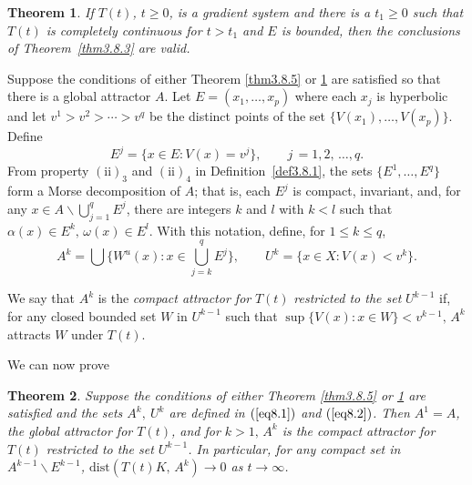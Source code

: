 \documentclass{surv-l}
\theoremstyle{plain}
\newtheorem{theorem}{Theorem}[section]
\theoremstyle{definition}
\numberwithin{equation}{section}
\numberwithin{figure}{chapter}
\begin{document}
\begin{theorem}\label{thm3.8.6} If $T(t)$, $t\geq 0$, is a gradient system and there is a $t_{1}\geq 0$ such that $T(t)$ is completely continuous for $t>t_{1}$ and $E$ is bounded, then the conclusions of Theorem~\ref{thm3.8.3} are valid.
\end{theorem}

Suppose the conditions of either Theorem \ref{thm3.8.5} or \ref{thm3.8.6} are satisfied so that there is a global attractor $A$. Let $E= (x_{1}, \ldots, x_{p})$ where each $x_{j}$ is hyperbolic and let $v^{1}>v^{2}> \cdots >v^{q}$ be the distinct points of the set $\{V(x_{1}),\ldots, V(x_{p})\}$. Define
\begin{equation}\label{eq8.1}
E^{j}=\{x\in E\!:V(x)=v^{j}\},\qquad j\,=1,2,\,\ldots,q.
\end{equation}
From property $(\mathrm{ii})_{3}$ and $(\mathrm{ii})_{4}$ in Definition~\ref{def3.8.1}, the sets $\{E^{1}, \ldots, E^{q}\}$ form a Morse decomposition of $A$; that is, each $E^{j}$ is compact, invariant, and, for any $x\in A\backslash \bigcup_{j=1}^{q}E^{j}$, there are integers $k$ and $l$ with $k<l$ such that $\alpha(x)\in E^{k},\, \omega(x)\in E^{l}$. With this notation, define, for $1\leq k\leq q$,
\begin{equation}\label{eq8.2}
A^{k}=\bigcup\{W^{u}(x)\!:x\in\bigcup_{j=k}^{q}E^{j}\},\qquad U^{k}=\{x\in X\!:V(x)<v^{k}\}.
\end{equation}

We say that $A^{k}$ is the \emph{compact attractor for} $T(t)$ \emph{restricted to the set} $U^{k-1}$ if, for any closed bounded set $W$ in $U^{k-1}$ such that $\sup\{V(x)\!:x\in W\}<v^{k-1},\, A^{k}$ attracts $W$ under $T(t)$.

We can now prove

\begin{theorem}\label{thm3.8.7} Suppose the conditions of either Theorem \emph{\ref{thm3.8.5}} or \emph{\ref{thm3.8.6}} are satisfied and the sets $A^{k},\ U^{k}$ are defined in $(\ref{eq8.1})$ and $(\ref{eq8.2})$. Then $A^{1}=A$, the global attractor for $T(t)$, and for $k>1,\, A^{k}$ is the compact attractor for $T(t)$ restricted to the set $U^{k-1}$. In particular, for any compact set in $A^{k-1}\backslash E^{k-1}$, $\mathrm{dist}(T(t)K,\, A^{k}) \rightarrow 0$ as $t\rightarrow\infty$.
\end{theorem}
\end{document}
